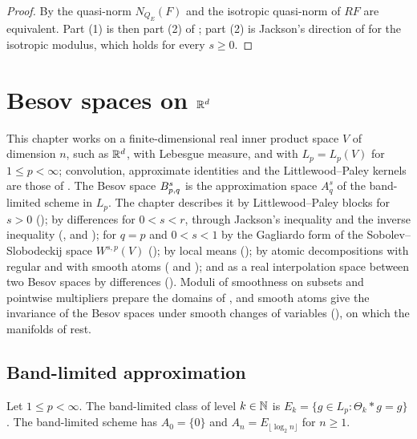 \begin{proof}
\leanok
By  the quasi-norm $N_{Q_E}(F)$ and the isotropic quasi-norm of
$R F$ are equivalent. Part (1) is then part (2) of ; part (2) is Jackson's
direction of  for the isotropic modulus, which holds for every
$s \geq 0$.
\end{proof}

\chapter{Besov spaces on \texorpdfstring{$\mathbb{R}^d$}{R\^{}d}}
\label{ch:rd}

This chapter works on a finite-dimensional real inner product space $V$ of dimension $n$, such
as $\mathbb{R}^d$, with Lebesgue measure, and with $L_p = L_p(V)$ for $1 \leq p < \infty$; convolution,
approximate identities and the Littlewood--Paley kernels are those of . The
Besov space $B^{s}_{p,q}$ is the approximation space $A^s_q$ of the band-limited scheme in
$L_p$. The chapter describes it by Littlewood--Paley blocks for $s > 0$ (); by
differences for $0 < s < r$, through Jackson's inequality and the inverse inequality
(,  and ); for $q = p$ and
$0 < s < 1$ by the Gagliardo form of the Sobolev--Slobodeckij space $W^{s,p}(V)$
(); by local means (); by atomic
decompositions with regular and with smooth atoms ( and
); and as a real interpolation space between two Besov
spaces by differences ().
Moduli of smoothness on subsets and pointwise multipliers prepare the domains of
, and smooth atoms give the invariance of the Besov spaces under
smooth changes of variables (), on which the manifolds of
 rest.

\section{Band-limited approximation}

\begin{definition}
\label{def:band-space}
\leanok
{}
Let $1 \leq p < \infty$. The band-limited class of level $k \in \mathbb{N}$ is
$E_k = \{ g \in L_p : \Theta_k * g = g \}$. The band-limited scheme has $A_0 = \{0\}$ and
$A_n = E_{\lfloor \log_2 n \rfloor}$ for $n \geq 1$.
\end{definition}


